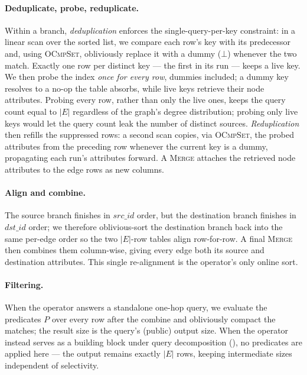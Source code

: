 \paragraph{Deduplicate, probe, reduplicate.}
Within a branch, \emph{deduplication} enforces the single-query-per-key
constraint: in a linear scan over the sorted list, we compare each row's key with
its predecessor and, using \textsc{OCmpSet}, obliviously replace it with a dummy
($\bot$) whenever the two match. Exactly one row per distinct key --- the first in
its run --- keeps a live key. We then probe the index \emph{once for every row},
dummies included; a dummy key resolves to a no-op the table absorbs, while live
keys retrieve their node attributes. Probing every row, rather than only the live
ones, keeps the query count equal to $|E|$ regardless of the graph's degree
distribution; probing only live keys would let the query count leak the number of
distinct sources. \emph{Reduplication} then refills the suppressed rows: a second
scan copies, via \textsc{OCmpSet}, the probed attributes from the preceding row
whenever the current key is a dummy, propagating each run's attributes forward. A
\textsc{Merge} attaches the retrieved node attributes to the edge rows as new
columns.

\paragraph{Align and combine.}
The source branch finishes in $src\_id$ order, but the destination branch finishes
in $dst\_id$ order; we therefore oblivious-sort the destination branch back into
the same per-edge order so the two $|E|$-row tables align row-for-row. A final
\textsc{Merge} then combines them column-wise, giving every edge both its source
and destination attributes. This single re-alignment is the operator's only online
sort.

\paragraph{Filtering.}
When the operator answers a standalone one-hop query, we evaluate the predicates
$P$ over every row after the combine and obliviously compact the matches; the
result size is the query's (public) output size. When the operator instead serves
as a building block under query decomposition (), no
predicates are applied here --- the output remains exactly $|E|$ rows, keeping
intermediate sizes independent of selectivity.

